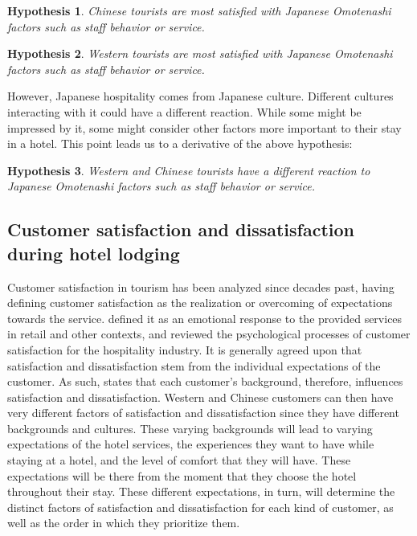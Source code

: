 \documentclass[smallextended,natbib]{svjour3}       %
\makeatletter
\newtheorem{hyp}{Hypothesis}
\newcounter{subhyp}
\newenvironment{subhyp}
   {%
    \setcounter{subhyp}{0}%
    \stepcounter{hyp}%
    \edef\saved@hyp{\thehyp}%
    \let\c@hyp\c@subhyp     %
    \renewcommand{\thehyp}{\saved@hyp\alph{hyp}}%
   }
   {}
\makeatother
\begin{document}
    \begin{subhyp}
    \begin{hyp}
    \label{hyp:omotenashi_zh}
    Chinese tourists are most satisfied with Japanese \textit{Omotenashi} factors such as staff behavior or service.
    \end{hyp}

    \begin{hyp}
    \label{hyp:omotenashi_en}
    Western tourists are most satisfied with Japanese \textit{Omotenashi} factors such as staff behavior or service.
    \end{hyp}

    However, Japanese hospitality comes from Japanese culture. Different cultures interacting with it could have a different reaction. While some might be impressed by it, some might consider other factors more important to their stay in a hotel. This point leads us to a derivative of the above hypothesis:

    \begin{hyp}
    \label{hyp:omotenashi_both}
    Western and Chinese tourists have a different reaction to Japanese \textit{Omotenashi} factors such as staff behavior or service.
    \end{hyp}
    \end{subhyp}

  \subsection{Customer satisfaction and dissatisfaction during hotel lodging}\label{theory_satisfaction}

    Customer satisfaction in tourism has been analyzed since decades past, \cite{hunt1975} having defining customer satisfaction as the realization or overcoming of expectations towards the service. \cite{oliver1981} defined it as an emotional response to the provided services in retail and other contexts, and \cite{oh1996} reviewed the psychological processes of customer satisfaction for the hospitality industry. It is generally agreed upon that satisfaction and dissatisfaction stem from the individual expectations of the customer. As such, \cite{engel1990} states that each customer's background, therefore, influences satisfaction and dissatisfaction. Western and Chinese customers can then have very different factors of satisfaction and dissatisfaction since they have different backgrounds and cultures. These varying backgrounds will lead to varying expectations of the hotel services, the experiences they want to have while staying at a hotel, and the level of comfort that they will have. These expectations will be there from the moment that they choose the hotel throughout their stay. These different expectations, in turn, will determine the distinct factors of satisfaction and dissatisfaction for each kind of customer, as well as the order in which they prioritize them. 
\end{document}
